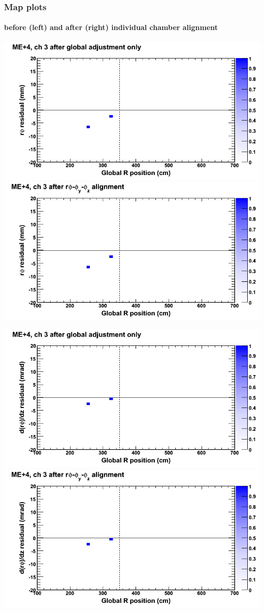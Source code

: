 \documentclass[compress]{beamer}
\begin{document}
\begin{frame}
\frametitle{Map plots}
\framesubtitle{before (left) and after (right) individual chamber alignment}
\includegraphics[width=0.5\linewidth]{ringmapplots_3dof/before_CSCvsr_mep4ch03_x.png} \includegraphics[width=0.5\linewidth]{ringmapplots_3dof/after_CSCvsr_mep4ch03_x.png}

\includegraphics[width=0.5\linewidth]{ringmapplots_3dof/before_CSCvsr_mep4ch03_dxdz.png} \includegraphics[width=0.5\linewidth]{ringmapplots_3dof/after_CSCvsr_mep4ch03_dxdz.png}
\end{frame}
\end{document}
